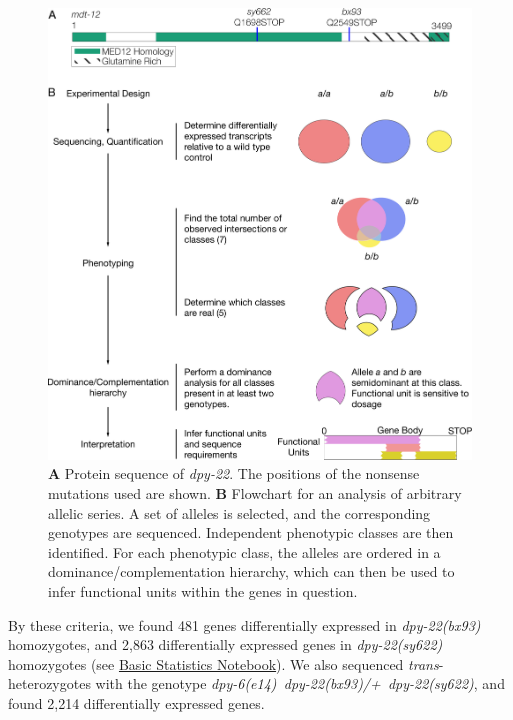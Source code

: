 \documentclass[8pt, twocolumn]{article}
\newcommand{\gene}[1]{\mbox{\emph{#1}}}
\newcommand{\dpy}[1]{\gene{dpy-22#1}}
\newcommand{\strongn}{2,863}
\newcommand{\weakn}{481}
\newcommand{\transn}{2,214}
\newcommand{\bx}{\dpy{(bx93)}}
\newcommand{\sy}{\dpy{(sy622)}}
\begin{document}
\begin{figure}
  \centering{}
  \includegraphics[width=\textwidth]{../../figs/Flowchart_Conceptual.pdf}
  \caption{
  \textbf{A} Protein sequence of \dpy{}. The positions of the nonsense
  mutations used are shown.
  \textbf{B} Flowchart for an analysis of arbitrary allelic series. A set of
  alleles is selected, and the corresponding genotypes are sequenced.
  Independent phenotypic classes are then identified. For each phenotypic class,
  the alleles are ordered in a dominance/complementation hierarchy, which can
  then be used to infer functional units within the genes in question.}
\label{fig:flowchart}
\end{figure}

By these criteria, we found \weakn{} genes differentially expressed in
\bx{} homozygotes, and \strongn{} differentially expressed genes in
\sy{} homozygotes (see
\href{https://wormlabcaltech.github.io/med-cafe/notebook/basic.html}{Basic
Statistics Notebook}). We also sequenced \emph{trans}-heterozygotes with the
genotype \gene{dpy-6(e14) dpy-22(bx93)/+ dpy-22(sy622)}, and found \transn{}
differentially expressed genes.
\end{document}
